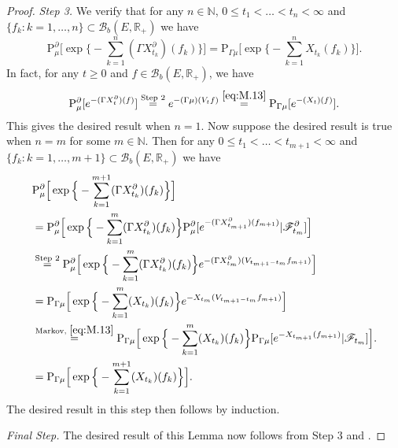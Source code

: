 \documentclass[12pt,a4paper]{amsart}
\numberwithin{equation}{section}
\theoremstyle{plain}
\theoremstyle{definition}
\theoremstyle{remark}
\begin{document}
\begin{proof}
\emph{Step 3.}
	We verify that for any $n\in \mathbb N$, $0\leq t_1 < \dots <t_n<\infty$ and $\{f_k: k = 1,\dots,n\}\subset \mathcal B_b(E,\mathbb R_+)$ we have
\[
	\mathrm P_\mu^\partial \Big[\exp \Big\{- \sum_{k=1}^n(\Gamma X_{t_k}^\partial)(f_k)\Big\}\Big]
	= \mathrm P_{\Gamma \mu} \Big[\exp \Big\{- \sum_{k=1}^n X_{t_k}(f_k)\Big\}\Big].
\]
	In fact, for any $t\geq 0$ and $f\in  \mathcal B_b(E,\mathbb R_+)$, we have
\[
	\mathrm P_\mu^\partial [e^{- (\Gamma X_{t}^\partial)(f)}]
	\overset{\text{Step 2}}= e^{- (\Gamma \mu)(V_{t}f)}
	\overset{\eqref{eq:M.13}}= \mathrm P_{\Gamma \mu} [e^{- ( X_{t})(f)}].
\]
	This gives the desired result when $n=1$.
	Now suppose the desired result is true when $n=m$ for some $m\in \mathbb N$.
	Then for any $0\leq t_1 < \dots <t_{m+1}<\infty$ and $\{f_k: k = 1,\dots, m+1\}\subset \mathcal B_b(E,\mathbb R_+)$ we have
\begin{align}
	&\mathrm P_\mu^\partial \Big[\exp \Big\{- \sum_{k=1}^{m+1}(\Gamma X_{t_k}^\partial)(f_k)\Big\} \Big]
	\\&= \mathrm P_\mu^\partial \Big[\exp \Big\{- \sum_{k=1}^{m}(\Gamma X_{t_k}^\partial)(f_k)\Big\} \mathrm P_\mu^\partial[e^{-(\Gamma X^\partial_{t_{m+1}}) (f_{m+1})}|\mathscr F^\partial_{t_m}]\Big]
	\\&\overset{\text{Step 2}} = \mathrm P_\mu^\partial \Big[\exp \Big\{- \sum_{k=1}^{m}(\Gamma X_{t_k}^\partial)(f_k)\Big\} e^{- (\Gamma X_{t_m}^\partial)(V_{t_{m+1}-t_m}f_{m+1})}\Big]
	\\&= \mathrm P_{\Gamma \mu} \Big[\exp \Big\{- \sum_{k=1}^{m}( X_{t_k})(f_k)\Big\}e^{-X_{t_m}(V_{t_{m+1}-t_m}f_{m+1})}\Big]
	\\&\overset{\text{Markov, }\eqref{eq:M.13}}= \mathrm P_{\Gamma \mu} \Big[\exp \Big\{- \sum_{k=1}^{m}( X_{t_k})(f_k)\Big\}\mathrm P_{\Gamma \mu}[e^{-X_{t_{m+1}}(f_{m+1})}|\mathscr F_{t_m}]\Big].
	\\& = \mathrm P_{\Gamma \mu} \Big[\exp \Big\{- \sum_{k=1}^{m+1}( X_{t_k})(f_k)\Big\}\Big].
\end{align}
	The desired result in this step then follows by induction.
	
\emph{Final Step.} The desired result of this Lemma now follows from Step 3 and \cite[Theorem 1.17]{Li2011Measure-valued}.
\end{proof}
\end{document}
